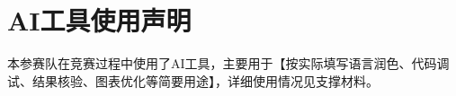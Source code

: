
\newif\ifcumcmaiused
\cumcmaiusedtrue

\section*{AI工具使用声明}

\ifcumcmaiused
  本参赛队在竞赛过程中使用了AI工具，主要用于【按实际填写语言润色、代码调试、结果核验、图表优化等简要用途】，详细使用情况见支撑材料。
\else
  本参赛队在竞赛过程中未使用任何AI工具。
\fi
